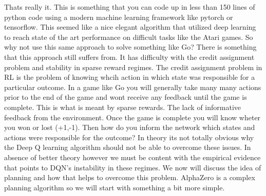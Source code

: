Thats really it. This is something that you can code up in less than 150 lines of python code using a modern machine learning framework like pytorch or tensorflow. This seemed like a nice elegant algorithm that utilized deep learning to reach state of the art performance on difficult tasks like the Atari games. So why not use this same approach to solve something like Go? There is something that this approach still suffers from. It has difficulty with the credit assignment problem and stability in sparse reward regimes. The credit assignment problem in RL is the problem of knowing whcih action in which state was responsible for a particular outcome. In a game like Go you will generally take many many actions prior to the end of the game and wont receive any feedback until the game is complete. This is what is meant by sparse rewards. The lack of informative feedback from the environment. Once the game is complete you will know wheter you won or lost (+1,-1). Then how do you inform the network which states and actions were responsible for the outcome? In theory its not totally obvious why the Deep Q learning algorithm should not be able to overcome these issues. In absence of better theory however we must be content with the empirical evidence that points to DQN's instability in these regimes. We now will discuss the idea of planning and how that helps to overcome this problem. AlphaZero is a complex planning algorithm so we will start with something a bit more simple. 